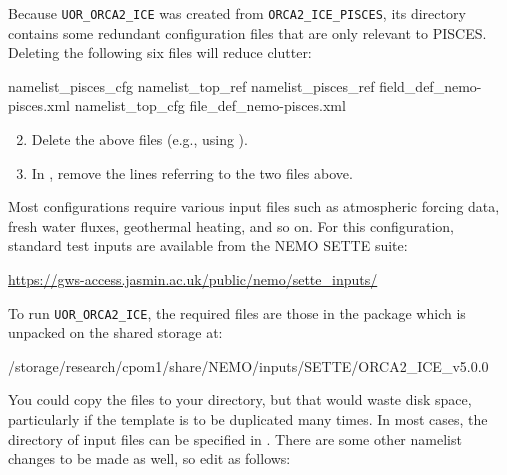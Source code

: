 Because \mbox{\texttt{UOR_ORCA2_ICE}} was created from \mbox{\texttt{ORCA2_ICE_PISCES}}, its  directory contains some redundant configuration files that are only relevant to PISCES.
Deleting the following six files will reduce clutter:

\begin{VerbatimFile}
namelist_pisces_cfg        namelist_top_ref
namelist_pisces_ref        field_def_nemo-pisces.xml
namelist_top_cfg           file_def_nemo-pisces.xml
\end{VerbatimFile}

\begin{enumerate}\setcounter{enumi}{1}
    \item Delete the above files (e.g., using ).
    \item In , remove the lines referring to the two  files above.
\end{enumerate}

Most \NEMOSIcu{} configurations require various input files such as atmospheric forcing data, fresh water fluxes, geothermal heating, and so on.
For this configuration, standard test inputs are available from the NEMO SETTE suite:

\begin{center}
    \url{https://gws-access.jasmin.ac.uk/public/nemo/sette\_inputs/}
\end{center}

To run \mbox{\texttt{UOR_ORCA2_ICE}}, the required files are those in the package \linebreak{} which is unpacked on the shared storage at:

\begin{VerbatimFile}
/storage/research/cpom1/share/NEMO/inputs/SETTE/ORCA2_ICE_v5.0.0
\end{VerbatimFile}

You could copy the files to your  directory, but that would waste disk space, particularly if the template is to be duplicated many times.
In most cases, the directory of input files can be specified in .
There are some other namelist changes to be made as well, so edit  as follows:

